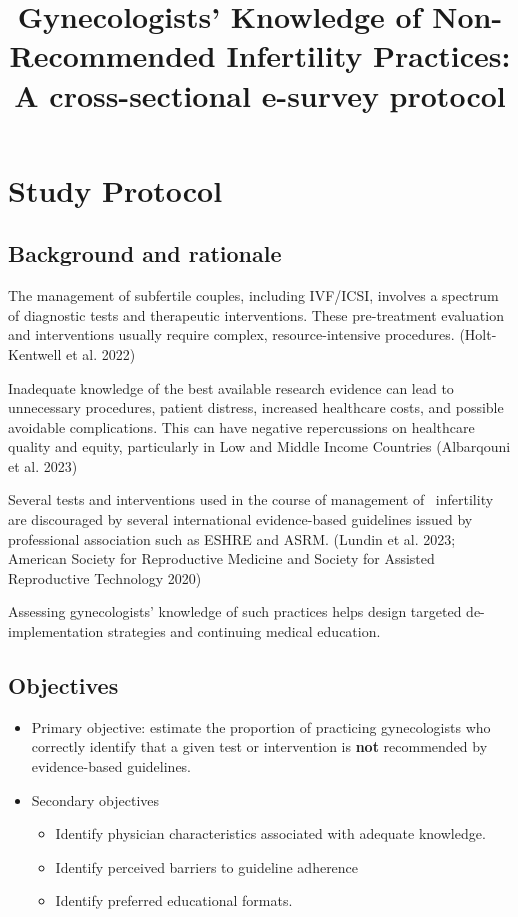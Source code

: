 \documentclass[
  letterpaper,
  DIV=11,
  numbers=noendperiod]{scrartcl}
\title{Gynecologists' Knowledge of Non-Recommended Infertility
Practices: A cross-sectional e-survey protocol}
\author{}
\date{}
\begin{document}
\maketitle


\section{Study Protocol}\label{study-protocol}

\subsection{Background and rationale}\label{background-and-rationale}

The management of subfertile couples, including IVF/ICSI, involves a
spectrum of diagnostic tests and therapeutic interventions. These
pre-treatment evaluation and interventions usually require complex,
resource-intensive procedures. (Holt-Kentwell et al. 2022)

Inadequate knowledge of the best available research evidence can lead to
unnecessary procedures, patient distress, increased healthcare costs,
and possible avoidable complications. This can have negative
repercussions on healthcare quality and equity, particularly in Low and
Middle Income Countries (Albarqouni et al. 2023)

Several tests and interventions used in the course of management of
~infertility are discouraged by several international evidence-based
guidelines issued by professional association such as ESHRE and ASRM.
(Lundin et al. 2023; American Society for Reproductive Medicine and
Society for Assisted Reproductive Technology 2020)

Assessing gynecologists' knowledge of such practices helps design
targeted de-implementation strategies and continuing medical education.

\subsection{Objectives}\label{objectives}

\begin{itemize}
\item
  Primary objective: estimate the proportion of practicing gynecologists
  who correctly identify that a given test or intervention is
  \textbf{not} recommended by evidence-based guidelines.
\item
  Secondary objectives

  \begin{itemize}
  \item
    Identify physician characteristics associated with adequate
    knowledge.
  \item
    Identify perceived barriers to guideline adherence
  \item
    Identify preferred educational formats.
  \end{itemize}
\end{itemize}
\end{document}
